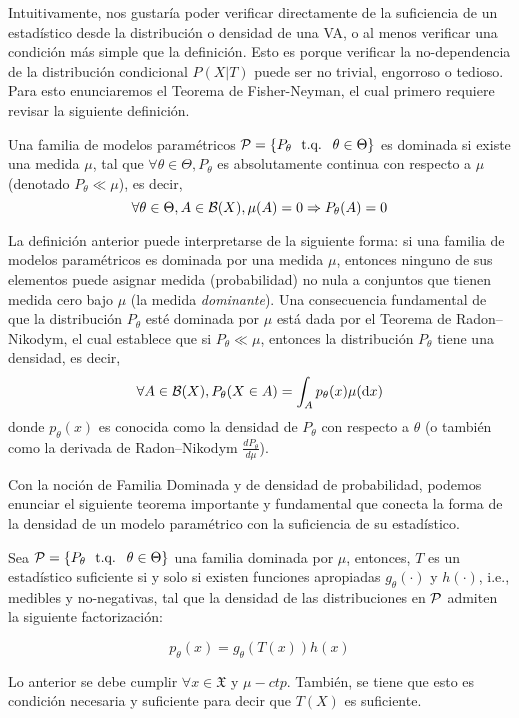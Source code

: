 Intuitivamente, nos gustaría poder verificar directamente de la suficiencia de un estadístico desde la distribución o densidad de una VA, o al menos verificar una condición más simple que la definición. Esto es porque verificar la no-dependencia de la distribución condicional $P(X|T)$ puede ser no trivial, engorroso o tedioso. Para esto enunciaremos el Teorema de Fisher-Neyman, el cual primero requiere revisar la siguiente definición. 



\begin{definition}
	Una familia de modelos paramétricos $\mathcal{P} = \{P_\theta\ {\text{ t.q. }}\ \theta\in\Theta\}$ es dominada si existe una medida $\mu$, tal que $\forall \theta\in\Theta, P_\theta$ es absolutamente continua con respecto a $\mu$ (denotado $ P_\theta \ll \mu$), es decir, 
	\begin{equation}
	\nonumber
		\forall \theta\in\Theta, A\in{\mathcal B}(X), \mu(A)=0 \Rightarrow P_\theta(A) = 0 
	\end{equation}
\end{definition}

La definición anterior puede interpretarse de la siguiente forma: si una familia de modelos paramétricos es dominada por una medida $\mu$, entonces ninguno de sus elementos puede asignar medida (probabilidad) no nula a conjuntos que tienen medida cero bajo $\mu$ (la medida \textit{dominante}). Una consecuencia fundamental de que la distribución $P_\theta$ esté dominada por $\mu$ está dada por el Teorema de Radon–Nikodym,  el cual establece que si $ P_\theta \ll \mu$, entonces la distribución $P_\theta$ tiene una densidad, es decir,	
	\begin{equation}
	\nonumber
		\forall A\in{\mathcal B}(X), P_\theta(X\in A) = \int _A p_\theta(x) \mu({\text{d}} x)
	\end{equation}
donde $p_\theta(x)$ es conocida como la densidad de $P_\theta$ con respecto a $\theta$ (o también como la derivada de Radon–Nikodym  $\frac{d P_\theta}{d \mu}$).

Con la noción de Familia Dominada y de densidad de probabilidad, podemos enunciar el siguiente teorema importante y fundamental que conecta la forma de la densidad de un modelo paramétrico con la suficiencia de su estadístico. 

\begin{theorem}
	\label{teo:neyman-fisher}
	
	Sea $\mathcal{P} = \{P_\theta\ {\text{ t.q. }}\ \theta\in\Theta\}$  una familia dominada por $\mu$, entonces, $T$ es un estadístico suficiente si y solo si existen funciones apropiadas $g_\theta(\cdot)$ y $h(\cdot)$, i.e., medibles y no-negativas, tal que la densidad de las distribuciones en ${\mathcal P}$ admiten la siguiente factorización: 
	
	\begin{equation}
		\label{eq:neyman-fisher}
		p_\theta (x) = g_\theta(T(x))h(x)  
	\end{equation}

    Lo anterior se debe cumplir $\forall x\in\mathfrak{X}$ y $\mu-ctp$. También, se tiene que esto es condición necesaria y suficiente para decir que $T(X)$ es suficiente.
\end{theorem}

